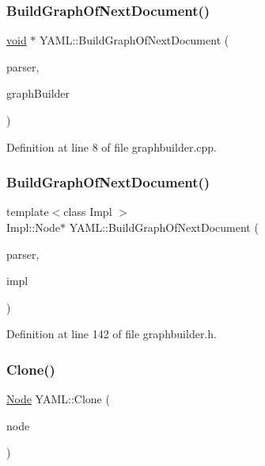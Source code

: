 \subsubsection{\texorpdfstring{BuildGraphOfNextDocument()}{BuildGraphOfNextDocument()}\hspace{0.1cm}{\footnotesize\ttfamily [1/2]}}
{\footnotesize\ttfamily \mbox{\hyperlink{glad_8h_a950fc91edb4504f62f1c577bf4727c29}{void}} $\ast$ Y\+A\+M\+L\+::\+Build\+Graph\+Of\+Next\+Document (\begin{DoxyParamCaption}\item[{\mbox{\hyperlink{class_y_a_m_l_1_1_parser}{Parser}} \&}]{parser,  }\item[{\mbox{\hyperlink{class_y_a_m_l_1_1_graph_builder_interface}{Graph\+Builder\+Interface}} \&}]{graph\+Builder }\end{DoxyParamCaption})}



Definition at line 8 of file graphbuilder.\+cpp.

\mbox{\label{namespace_y_a_m_l_a4c1897a86c4a186c3296347c51341dd1}} 
\subsubsection{\texorpdfstring{BuildGraphOfNextDocument()}{BuildGraphOfNextDocument()}\hspace{0.1cm}{\footnotesize\ttfamily [2/2]}}
{\footnotesize\ttfamily template$<$class Impl $>$ \\
Impl\+::\+Node$\ast$ Y\+A\+M\+L\+::\+Build\+Graph\+Of\+Next\+Document (\begin{DoxyParamCaption}\item[{\mbox{\hyperlink{class_y_a_m_l_1_1_parser}{Parser}} \&}]{parser,  }\item[{Impl \&}]{impl }\end{DoxyParamCaption})}



Definition at line 142 of file graphbuilder.\+h.

\mbox{\label{namespace_y_a_m_l_a40aba967a1b8b1eefaa68c08fc9eebdf}} 
\subsubsection{\texorpdfstring{Clone()}{Clone()}}
{\footnotesize\ttfamily \mbox{\hyperlink{class_y_a_m_l_1_1_node}{Node}} Y\+A\+M\+L\+::\+Clone (\begin{DoxyParamCaption}\item[{const \mbox{\hyperlink{class_y_a_m_l_1_1_node}{Node}} \&}]{node }\end{DoxyParamCaption})}



